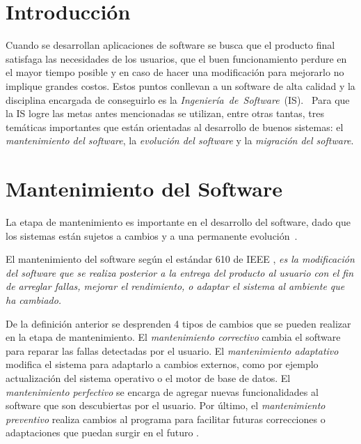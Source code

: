 
\section{Introducción}


Cuando se desarrollan aplicaciones de software se busca que el producto final satisfaga las necesidades de los usuarios, que el buen funcionamiento perdure en el mayor tiempo posible y en caso de hacer una modificación para mejorarlo no implique grandes costos. Estos puntos conllevan a un software de alta calidad y la disciplina encargada de conseguirlo es la \mbox{\textit{Ingeniería de Software} (IS). }%
Para que la IS logre las metas antes mencionadas se utilizan, entre otras tantas, tres temáticas importantes que están orientadas al desarrollo de buenos sistemas: el \textit{mantenimiento del software}, la \textit{evolución del software} y la \textit{migración del software}. 

\section{Mantenimiento del Software}

La etapa de mantenimiento es importante en el desarrollo del software, dado que los sistemas están sujetos a cambios y a una permanente \mbox{evolución \cite{PFT02}.}

El mantenimiento del software según el estándar 610 de IEEE \cite{STD610}, \textit{es la mo\-dificación del software que se realiza posterior a la entrega del producto al usuario con el fin de arreglar fallas, mejorar el rendimiento, o adaptar el sistema al ambiente que ha cambiado.}

De la definición anterior se desprenden 4 tipos de cambios que se pueden realizar en la etapa de mantenimiento. El \textit{mantenimiento correctivo} cambia el software para reparar las fallas detectadas por el usuario. El \textit{mantenimiento adaptativo} modifica el sistema para adaptarlo a cambios externos, como por ejemplo actualización del sistema operativo o el motor de base de datos. El \textit{mantenimiento perfectivo} se encarga de agregar nuevas funcionalidades al software que son descubiertas por el usuario. Por último, el \textit{mantenimiento preventivo} realiza cambios al programa para facilitar futuras correcciones o adaptaciones que puedan surgir en el futuro \cite{RSPMGH02}.

